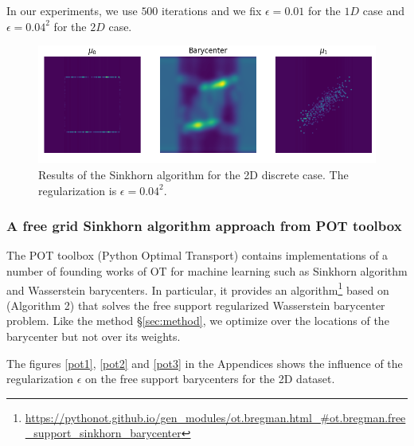 In our experiments, we use $500$ iterations and we fix $\epsilon = 0.01$ for the $1D$ case and $\epsilon = 0.04^2$ for the $2D$ case. 

\begin{figure}
    \centering
    \includegraphics[width=\textwidth]{figures/sinkhorn_barycenter_2D_discrete.png}
    \caption{Results of the Sinkhorn algorithm for the 2D discrete case. The regularization is $\epsilon = 0.04^2$.}
    \label{fig:sinkhorn_2D_discrete}
\end{figure}

\subsubsection{A free grid Sinkhorn algorithm approach from POT toolbox}
\label{sec:pot}

The POT toolbox (Python Optimal Transport) \cite{flamary_pot_2021} contains implementations of a number of founding works of OT for machine learning such as Sinkhorn algorithm and Wasserstein barycenters. In particular, it provides an algorithm\footnote{\url{https://pythonot.github.io/gen_modules/ot.bregman.html_\#ot.bregman.free_support_sinkhorn_barycenter}} based on \cite{cuturi_fast_2014} (Algorithm 2) that solves the free support regularized Wasserstein barycenter problem. Like the method \S\ref{sec:method}, we optimize over the locations of the barycenter but not over its weights. 

The figures \ref{pot1}, \ref{pot2} and \ref{pot3} in the Appendices shows the influence of the regularization $\epsilon$ on the free support barycenters for the 2D dataset.

